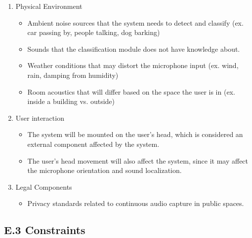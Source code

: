 \documentclass[12pt]{article}
\theoremstyle{definition}
\begin{document}
\begin{enumerate}
  \item Physical Environment
  \begin{itemize}
    \item Ambient noise sources that the system needs to detect and classify
    (ex. car passing by, people talking, dog barking)
    \item Sounds that the classification module does not have knowledge about. 
    \item Weather conditions that may distort the microphone input
    (ex. wind, rain, damping from humidity)
    \item Room acoustics that will differ based on the space the user is in
    (ex. inside a building vs. outside)
  \end{itemize}

  \item User interaction
  \begin{itemize}
    \item The system will be mounted on the user's head, which is considered an
    external component affected by the system.
    \item The user's head movement will also affect the system, since it may
    affect the microphone orientation and sound localization. 
  \end{itemize}

  \item Legal Components
  \begin{itemize}
    \item Privacy standards related to continuous audio capture in public
    spaces. 
  \end{itemize}
\end{enumerate}

\subsection{E.3 Constraints}
\end{document}
